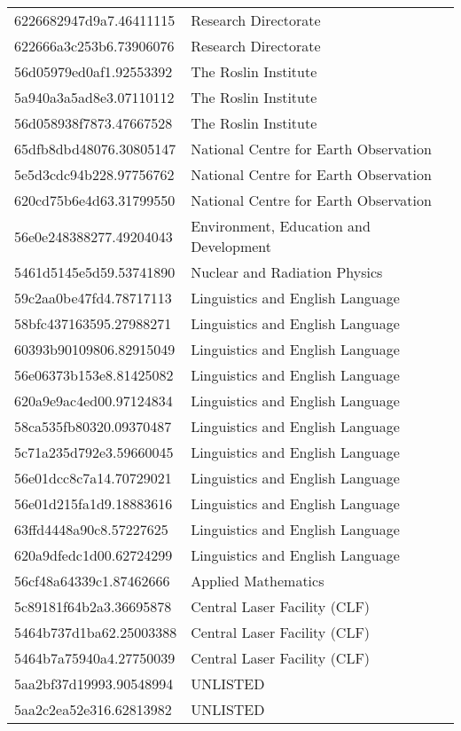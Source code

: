 \begin{tabular}{ll}
6226682947d9a7.46411115 & Research Directorate \\
622666a3c253b6.73906076 & Research Directorate \\
56d05979ed0af1.92553392 & The Roslin Institute \\
5a940a3a5ad8e3.07110112 & The Roslin Institute \\
56d058938f7873.47667528 & The Roslin Institute \\
65dfb8dbd48076.30805147 & National Centre for Earth Observation \\
5e5d3cdc94b228.97756762 & National Centre for Earth Observation \\
620cd75b6e4d63.31799550 & National Centre for Earth Observation \\
56e0e248388277.49204043 & Environment, Education and Development \\
5461d5145e5d59.53741890 & Nuclear and Radiation Physics \\
59c2aa0be47fd4.78717113 & Linguistics and English Language \\
58bfc437163595.27988271 & Linguistics and English Language \\
60393b90109806.82915049 & Linguistics and English Language \\
56e06373b153e8.81425082 & Linguistics and English Language \\
620a9e9ac4ed00.97124834 & Linguistics and English Language \\
58ca535fb80320.09370487 & Linguistics and English Language \\
5c71a235d792e3.59660045 & Linguistics and English Language \\
56e01dcc8c7a14.70729021 & Linguistics and English Language \\
56e01d215fa1d9.18883616 & Linguistics and English Language \\
63ffd4448a90c8.57227625 & Linguistics and English Language \\
620a9dfedc1d00.62724299 & Linguistics and English Language \\
56cf48a64339c1.87462666 & Applied Mathematics \\
5c89181f64b2a3.36695878 & Central Laser Facility (CLF) \\
5464b737d1ba62.25003388 & Central Laser Facility (CLF) \\
5464b7a75940a4.27750039 & Central Laser Facility (CLF) \\
5aa2bf37d19993.90548994 & UNLISTED \\
5aa2c2ea52e316.62813982 & UNLISTED \\

\end{tabular}
